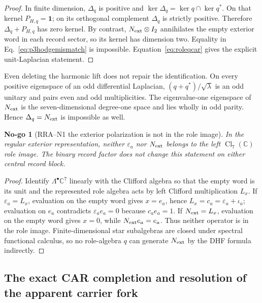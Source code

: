 \documentclass[11pt,a4paper]{article}
\newtheorem{nogo}[definition]{No-go}
\theoremstyle{remark}
\newcommand{\id}{\mathbf 1}
\begin{document}
\begin{proof}
In finite dimension, $\Delta_q$ is positive and
$\ker\Delta_q=\ker q\cap\ker q^*$.  On that kernel $P_{H,q}=\id$; on its
orthogonal complement $\Delta_q$ is strictly positive.  Therefore
$\Delta_q+P_{H,q}$ has zero kernel.  By contrast,
$N_{\rm ext}\otimes I_2$ annihilates the empty exterior word in each record
sector, so its kernel has dimension two.  Equality in
Eq.~\eqref{eq:p3hodgemismatch} is impossible.  Equation~\eqref{eq:roleqcar}
gives the explicit unit-Laplacian statement.
\end{proof}

Even deleting the harmonic lift does not repair the identification.  On
every positive eigenspace of an odd differential Laplacian,
$(q+q^*)/\sqrt\lambda$ is an odd unitary and pairs even and odd
multiplicities.  The eigenvalue-one eigenspace of $N_{\rm ext}$ is the
seven-dimensional degree-one space and lies wholly in odd parity.  Hence
$\Delta_q=N_{\rm ext}$ is impossible as well.

\begin{nogo}[RRA--N1 the exterior polarization is not in the role image]
In the regular exterior representation, neither $\varepsilon_a$ nor
$N_{\rm ext}$ belongs to the left $\operatorname{Cl}_7(\mathbb C)$ role
image.  The binary record factor does not change this statement on either
central record block.
\end{nogo}

\begin{proof}
Identify $\Lambda^\bullet\mathbb C^7$ linearly with the Clifford algebra so
that the empty word is its unit and the represented role algebra acts by left
Clifford multiplication $L_x$.  If $\varepsilon_a=L_x$, evaluation on the
empty word gives $x=e_a$, hence $L_x=c_a=\varepsilon_a+\iota_a$; evaluation
on $e_a$ contradicts $\varepsilon_ae_a=0$ because $c_ae_a=1$.  If
$N_{\rm ext}=L_x$, evaluation on the empty word gives $x=0$, while
$N_{\rm ext}e_a=e_a$.  Thus neither operator is in the role image.
Finite-dimensional star subalgebras are closed under spectral functional
calculus, so no role-algebra $q$ can generate $N_{\rm ext}$ by the DHF
formula indirectly.
\end{proof}

\subsection{The exact CAR completion and resolution of the apparent carrier fork}
\end{document}
